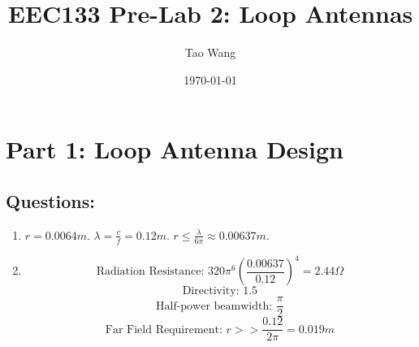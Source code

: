 \documentclass{article} %
\begin{document}
\title{EEC133 Pre-Lab 2: Loop Antennas}
\author{Tao Wang}
\date{\today}

\maketitle
\tableofcontents

\section*{Part 1: Loop Antenna Design}

\subsection*{Questions:}
\begin{enumerate}
    \item $r = 0.0064 \si{m}$. $\lambda = \frac{c}{f} = 0.12 \si{m}$. $r \leq \frac{\lambda}{6 \pi} \approx 0.00637 \si{m}$.
    \item
          \[\text{Radiation Resistance: }320 \pi^6 \left(\frac{0.00637}{0.12}\right)^4 = 2.44 \Omega \]
          \[\text{Directivity: } 1.5\]
          \[\text{Half-power beamwidth: } \frac{\pi}{2}\]
          \[\text{Far Field Requirement: } r >> \frac{0.12}{2\pi} = 0.019 \si{m}\]
\end{enumerate}
\end{document}
